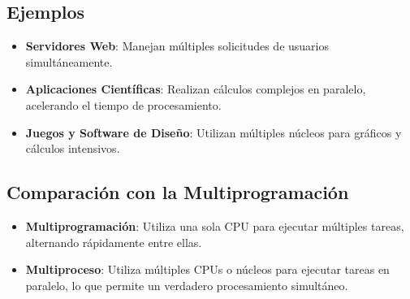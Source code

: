 \subsection{Ejemplos}
\begin{itemize}
	\item \textbf{Servidores Web}: Manejan múltiples solicitudes de usuarios simultáneamente.
	\item \textbf{Aplicaciones Científicas}: Realizan cálculos complejos en paralelo, acelerando el tiempo de procesamiento.
	\item \textbf{Juegos y Software de Diseño}: Utilizan múltiples núcleos para gráficos y cálculos intensivos.
\end{itemize}

\subsection*{Comparación con la Multiprogramación}
\begin{itemize}
	\item \textbf{Multiprogramación}: Utiliza una sola CPU para ejecutar múltiples tareas, alternando rápidamente entre ellas.
	\item \textbf{Multiproceso}: Utiliza múltiples CPUs o núcleos para ejecutar tareas en paralelo, lo que permite un verdadero procesamiento simultáneo.
\end{itemize}

